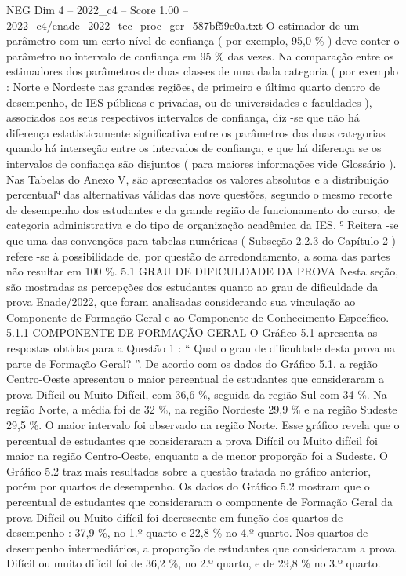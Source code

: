\begin{textsample}{NEG Dim 4 – 2022\_c4 – Score 1.00 – 2022\_c4/enade\_2022\_tec\_proc\_ger\_587bf59e0a.txt}
O estimador de um parâmetro com um certo nível de confiança ( por exemplo, 95,0 \% ) deve conter o parâmetro no intervalo de confiança em 95 \% das vezes.
Na comparação entre os estimadores dos parâmetros de duas classes de uma dada categoria ( por exemplo : Norte e Nordeste nas grandes regiões, de primeiro e último quarto dentro de desempenho, de IES públicas e privadas, ou de universidades e faculdades ), associados aos seus respectivos intervalos de confiança, diz -se que não há diferença estatisticamente significativa entre os parâmetros das duas categorias quando há interseção entre os intervalos de confiança, e que há diferença se os intervalos de confiança são disjuntos ( para maiores informações vide Glossário ).
Nas Tabelas do Anexo V, são apresentados os valores absolutos e a distribuição percentual⁹ das alternativas válidas das nove questões, segundo o mesmo recorte de desempenho dos estudantes e da grande região de funcionamento do curso, de categoria administrativa e do tipo de organização acadêmica da IES. ⁹ Reitera -se que uma das convenções para tabelas numéricas ( Subseção 2.2.3 do Capítulo 2 ) refere -se à possibilidade de, por questão de arredondamento, a soma das partes não resultar em 100 \%. 5.1 GRAU DE DIFICULDADE DA PROVA Nesta seção, são mostradas as percepções dos estudantes quanto ao grau de dificuldade da prova Enade/2022, que foram analisadas considerando sua vinculação ao Componente de Formação Geral e ao Componente de Conhecimento Específico. 5.1.1 COMPONENTE DE FORMAÇÃO GERAL O Gráfico 5.1 apresenta as respostas obtidas para a Questão 1 : “ Qual o grau de dificuldade desta prova na parte de Formação Geral? ”.
De acordo com os dados do Gráfico 5.1, a região Centro-Oeste apresentou o maior percentual de estudantes que consideraram a prova Difícil ou Muito Difícil, com 36,6 \%, seguida da região Sul com 34 \%.
Na região Norte, a média foi de 32 \%, na região Nordeste 29,9 \% e na região Sudeste 29,5 \%.
O maior intervalo foi observado na região Norte.
Esse gráfico revela que o percentual de estudantes que consideraram a prova Difícil ou Muito difícil foi maior na região Centro-Oeste, enquanto a de menor proporção foi a Sudeste.
O Gráfico 5.2 traz mais resultados sobre a questão tratada no gráfico anterior, porém por quartos de desempenho.
Os dados do Gráfico 5.2 mostram que o percentual de estudantes que consideraram o componente de Formação Geral da prova Difícil ou Muito difícil foi decrescente em função dos quartos de desempenho : 37,9 \%, no 1.º quarto e 22,8 \% no 4.º quarto.
Nos quartos de desempenho intermediários, a proporção de estudantes que consideraram a prova Difícil ou muito difícil foi de 36,2 \%, no 2.º quarto, e de 29,8 \% no 3.º quarto.

\end{textsample}

